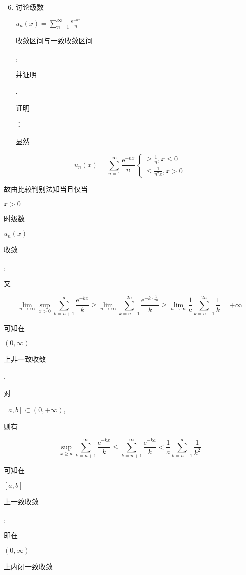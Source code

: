 \documentclass[10pt]{article}
\begin{document}
\begin{enumerate}
  \setcounter{enumi}{5}
  \item \begin{CJK}{UTF8}{mj}讨论级数\end{CJK} $u_{n}(x)=\sum_{n=1}^{\infty} \frac{\mathrm{e}^{-n x}}{n}$ \begin{CJK}{UTF8}{mj}收敛区间与一致收敛区间\end{CJK}, \begin{CJK}{UTF8}{mj}并证明\end{CJK}. \begin{CJK}{UTF8}{mj}证明\end{CJK}：\begin{CJK}{UTF8}{mj}显然\end{CJK}
\end{enumerate}
$$
u_{n}(x)=\sum_{n=1}^{\infty} \frac{\mathrm{e}^{-n x}}{n}\left\{\begin{array}{l}
\geq \frac{1}{n}, x \leq 0 \\
\leq \frac{1}{n^{2} x}, x>0
\end{array}\right.
$$
\begin{CJK}{UTF8}{mj}故由比较判别法知当且仅当\end{CJK} $x>0$ \begin{CJK}{UTF8}{mj}时级数\end{CJK} $u_{n}(x)$ \begin{CJK}{UTF8}{mj}收敛\end{CJK}, \begin{CJK}{UTF8}{mj}又\end{CJK}
$$
\lim _{n \rightarrow \infty} \sup _{x>0} \sum_{k=n+1}^{\infty} \frac{\mathrm{e}^{-k x}}{k} \geqslant \lim _{n \rightarrow \infty} \sum_{k=n+1}^{2 n} \frac{\mathrm{e}^{-k \cdot \frac{1}{2 n}}}{k} \geqslant \lim _{n \rightarrow \infty} \frac{1}{\mathrm{e}} \sum_{k=n+1}^{2 n} \frac{1}{k}=+\infty
$$
\begin{CJK}{UTF8}{mj}可知在\end{CJK} $(0, \infty)$ \begin{CJK}{UTF8}{mj}上非一致收敛\end{CJK}.

\begin{CJK}{UTF8}{mj}对\end{CJK} $[a, b] \subset(0,+\infty)$, \begin{CJK}{UTF8}{mj}则有\end{CJK}
$$
\sup _{x \geq a} \sum_{k=n+1}^{\infty} \frac{\mathrm{e}^{-k x}}{k} \leq \sum_{k=n+1}^{\infty} \frac{\mathrm{e}^{-k a}}{k}<\frac{1}{a} \sum_{k=n+1}^{\infty} \frac{1}{k^{2}}
$$
\begin{CJK}{UTF8}{mj}可知在\end{CJK} $[a, b]$ \begin{CJK}{UTF8}{mj}上一致收敛\end{CJK}, \begin{CJK}{UTF8}{mj}即在\end{CJK} $(0, \infty)$ \begin{CJK}{UTF8}{mj}上内闭一致收敛\end{CJK}
\end{document}
